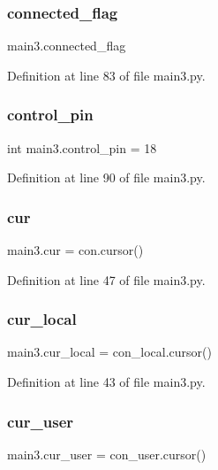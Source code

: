 \mbox{\label{namespacemain3_ad437a0de30e4b6dfc9d354c3d56e43ac}} 
\subsubsection{connected\+\_\+flag}
{\footnotesize\ttfamily main3.\+connected\+\_\+flag}



Definition at line 83 of file main3.\+py.

\mbox{\label{namespacemain3_a71b20202aeb60b168b1dcee86f9d0d2a}} 
\subsubsection{control\+\_\+pin}
{\footnotesize\ttfamily int main3.\+control\+\_\+pin = 18}



Definition at line 90 of file main3.\+py.

\mbox{\label{namespacemain3_a4a9cd088c1387b19bfaa89ed31b577c2}} 
\subsubsection{cur}
{\footnotesize\ttfamily main3.\+cur = con.\+cursor()}



Definition at line 47 of file main3.\+py.

\mbox{\label{namespacemain3_a25fd8974a655b4dc7bed362d3406bec3}} 
\subsubsection{cur\+\_\+local}
{\footnotesize\ttfamily main3.\+cur\+\_\+local = con\+\_\+local.\+cursor()}



Definition at line 43 of file main3.\+py.

\mbox{\label{namespacemain3_aac45a371e86ea7af1ea340ec4e0f95a9}} 
\subsubsection{cur\+\_\+user}
{\footnotesize\ttfamily main3.\+cur\+\_\+user = con\+\_\+user.\+cursor()}



